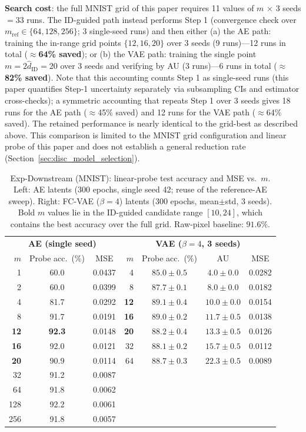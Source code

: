 \documentclass[make,article,submit,pdftex,moreauthors]{Definitions/mdpi}
\newcommand{\hatdID}{\hat{d}_{\mathrm{ID}}}
\begin{document}
\textbf{Search cost}: the full MNIST grid of this paper requires 11 values
of $m$ $\times$ 3 seeds $= 33$ runs.
The ID-guided path instead performs Step 1 (convergence check over
$m_{\mathrm{ref}} \in \{64, 128, 256\}$; 3 single-seed runs) and then either
(a) the AE path: training the in-range grid points $\{12, 16, 20\}$ over 3
seeds (9 runs)---12 runs in total (\textbf{$\approx$64\% saved}); or
(b) the VAE path: training the single point $m = 2\hatdID = 20$ over 3 seeds
and verifying by AU (3 runs)---6 runs in total
(\textbf{$\approx$82\% saved}).
Note that this accounting counts Step 1 as single-seed runs (this paper
quantifies Step-1 uncertainty separately via subsampling CIs and estimator
cross-checks); a symmetric accounting that repeats Step 1 over 3 seeds
gives 18 runs for the AE path ($\approx$45\% saved) and 12 runs for the VAE
path ($\approx$64\% saved).
The retained performance is nearly identical to the grid-best as described
above.
This comparison is limited to the MNIST grid configuration and linear probe
of this paper and does not establish a general reduction rate
(Section~\ref{sec:disc_model_selection}).

\begin{table}[H]
\caption{Exp-Downstream (MNIST): linear-probe test accuracy and MSE vs.\
$m$. Left: AE latents (300 epochs, single seed 42; reuse of the
reference-AE sweep). Right: FC-VAE ($\beta = 4$) latents (300 epochs,
mean$\pm$std, 3 seeds). Bold $m$ values lie in the ID-guided candidate
range $[10, 24]$, which contains the best accuracy over the full grid.
Raw-pixel baseline: $91.6\%$.}
\label{tab:downstream}
\small
\begin{tabular}{r cc | r ccc}
\toprule
\multicolumn{3}{c|}{\textbf{AE (single seed)}} & \multicolumn{4}{c}{\textbf{VAE ($\beta = 4$, 3 seeds)}} \\
$m$ & Probe acc.\ (\%) & MSE & $m$ & Probe acc.\ (\%) & AU & MSE \\
\midrule
1 & 60.0 & 0.0437 & 4 & $85.0 \pm 0.5$ & $4.0 \pm 0.0$ & 0.0282 \\
2 & 60.0 & 0.0399 & 8 & $87.7 \pm 0.1$ & $8.0 \pm 0.0$ & 0.0182 \\
4 & 81.7 & 0.0292 & \textbf{12} & $\boldsymbol{89.1 \pm 0.4}$ & $10.0 \pm 0.0$ & 0.0154 \\
8 & 91.7 & 0.0191 & \textbf{16} & $89.0 \pm 0.2$ & $11.7 \pm 0.5$ & 0.0138 \\
\textbf{12} & \textbf{92.3} & 0.0148 & \textbf{20} & $88.2 \pm 0.4$ & $13.3 \pm 0.5$ & 0.0126 \\
\textbf{16} & 92.0 & 0.0121 & 32 & $88.1 \pm 0.2$ & $15.7 \pm 0.5$ & 0.0112 \\
\textbf{20} & 90.9 & 0.0114 & 64 & $88.7 \pm 0.3$ & $22.3 \pm 0.5$ & 0.0089 \\
32 & 91.2 & 0.0087 &  & & & \\
64 & 91.8 & 0.0062 &  & & & \\
128 & 92.2 & 0.0061 &  & & & \\
256 & 91.8 & 0.0057 &  & & & \\
\bottomrule
\end{tabular}
\end{table}
\end{document}
